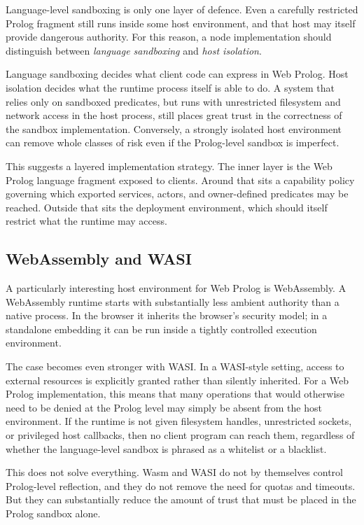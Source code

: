 Language-level sandboxing is only one layer of defence. Even a carefully restricted Prolog fragment still runs inside some host environment, and that host may itself provide dangerous authority. For this reason, a node implementation should distinguish between \emph{language sandboxing} and \emph{host isolation}.

Language sandboxing decides what client code can express in Web Prolog. Host isolation decides what the runtime process itself is able to do. A system that relies only on sandboxed predicates, but runs with unrestricted filesystem and network access in the host process, still places great trust in the correctness of the sandbox implementation. Conversely, a strongly isolated host environment can remove whole classes of risk even if the Prolog-level sandbox is imperfect.

This suggests a layered implementation strategy. The inner layer is the Web Prolog language fragment exposed to clients. Around that sits a capability policy governing which exported services, actors, and owner-defined predicates may be reached. Outside that sits the deployment environment, which should itself restrict what the runtime may access.

\subsection{WebAssembly and WASI}

A particularly interesting host environment for Web Prolog is WebAssembly. A WebAssembly runtime starts with substantially less ambient authority than a native process. In the browser it inherits the browser's security model; in a standalone embedding it can be run inside a tightly controlled execution environment.

The case becomes even stronger with WASI. In a WASI-style setting, access to external resources is explicitly granted rather than silently inherited. For a Web Prolog implementation, this means that many operations that would otherwise need to be denied at the Prolog level may simply be absent from the host environment. If the runtime is not given filesystem handles, unrestricted sockets, or privileged host callbacks, then no client program can reach them, regardless of whether the language-level sandbox is phrased as a whitelist or a blacklist.

This does not solve everything. Wasm and WASI do not by themselves control Prolog-level reflection, and they do not remove the need for quotas and timeouts. But they can substantially reduce the amount of trust that must be placed in the Prolog sandbox alone.

